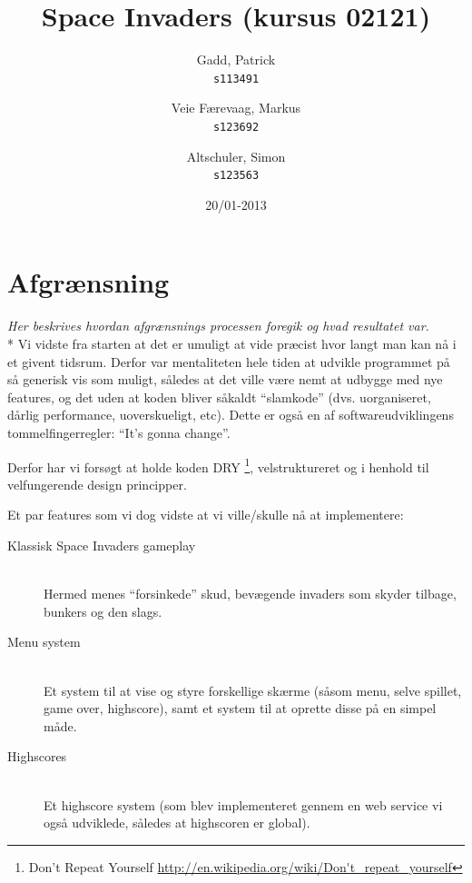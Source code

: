 \documentclass[titlepage,danish]{article}
\begin{document}
\title{Space Invaders (kursus 02121)}
\date{20/01-2013}
\author{
  Gadd, Patrick\\
  \texttt{s113491}
  \and
  Veie Færevaag, Markus\\
  \texttt{s123692}
  \and
  Altschuler, Simon\\
  \texttt{s123563}
}
\maketitle

\section{Afgrænsning}
\emph{Her beskrives hvordan afgrænsnings processen foregik og hvad resultatet var.}\\*
Vi vidste fra starten at det er umuligt at vide præcist hvor langt man kan nå i et givent
tidsrum. Derfor var mentaliteten hele tiden at udvikle programmet på så generisk vis som muligt,
således at det ville være nemt at udbygge med nye features, og det uden at koden bliver såkaldt
``slamkode'' (dvs. uorganiseret, dårlig performance, uoverskueligt, etc). Dette er også en af
softwareudviklingens tommelfingerregler: ``It's gonna change''.

Derfor har vi forsøgt at holde koden DRY \footnote{Don't Repeat Yourself
  \url{http://en.wikipedia.org/wiki/Don't_repeat_yourself}}, velstruktureret og i henhold til velfungerende design principper.

Et par features som vi dog vidste at vi ville/skulle nå at implementere:
\begin{description}
  \item[Klassisk Space Invaders gameplay] \hfill \\
    Hermed menes ``forsinkede'' skud, bevægende invaders som skyder tilbage, bunkers og den slags.

  \item[Menu system] \hfill \\
    Et system til at vise og styre forskellige skærme (såsom menu, selve spillet, game over,
    highscore), samt et system til at oprette disse på en simpel måde.

  \item[Highscores] \hfill \\
    Et highscore system (som blev implementeret gennem en web service vi også udviklede, således at
    highscoren er global).

\end{description}
\end{document}
